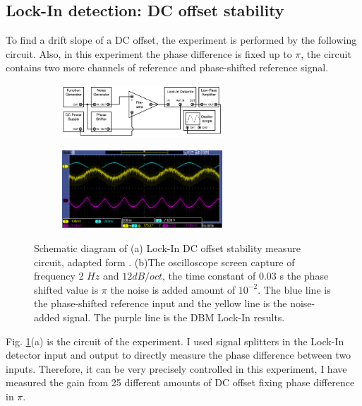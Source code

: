 \documentclass{article}
\begin{document}
\subsection{Lock-In detection: DC offset stability}
 To find a drift slope of a DC offset, the experiment is performed by the following circuit.
 Also, in this experiment the phase difference is fixed up to $\pi$, the circuit contains two more channels of reference and phase-shifted reference signal.
 \begin{figure}[ht]
    \centering
    \begin{subfigure}[b]{6cm}
        \centering
        \includegraphics[width=6cm]{../results/DC_off_set_circuit.png}
        \caption{}
    \end{subfigure}
    \hfill
    \begin{subfigure}[b]{6cm}
        \centering
        \includegraphics[width=6cm]{../raw_data/TEK00640.PNG}
        \caption{}
    \end{subfigure}
    \hfill
    \caption{Schematic diagram of (a) Lock-In DC offset stability measure circuit, adapted form  \cite{signal_processor}.
    (b)The oscilloscope screen capture of frequency 2 $Hz$ and $12 dB/oct$, the time constant of $0.03$ s the phase shifted value is $\pi$ the noise is added amount of $10^{-2}$.
    The blue line is the phase-shifted reference input and the yellow line is the noise-added signal.
    The purple line is the DBM Lock-In results.
    }
    \label{fig: DC_off_set_circuit}
  \end{figure}
 Fig. \ref{fig: DC_off_set_circuit}(a) is the circuit of the experiment.
 I used signal splitters in the Lock-In detector input and output to directly measure the phase difference between two inputs.
 Therefore, it can be very precisely controlled in this experiment, I have measured the gain from 25 different amounts of DC offset fixing phase difference in $\pi$.
\end{document}
